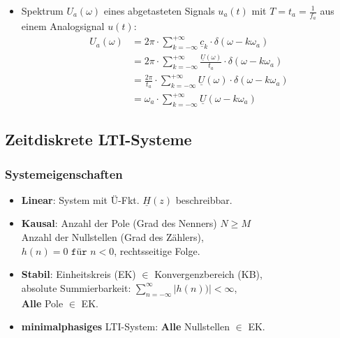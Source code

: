 \begin{itemize}
{	\textit{Abhilfe}: Eingangssignal auf $\omega_g$-Band begrenzen und\\ \textbf{Abtasttheorem} einhalten, Verringerung von $t_a$.}
\normalsize
\begin{gather*}
	\boxed{\omega_a \ge 2 \omega_g} \text{ bzw. } f_a \ge 2 f_g\\
	\boxed{\omega_g \le \frac{\omega_a}{2}} = \frac{1}{2} \cdot \frac{2\pi}{t_a} \text{ bzw. } f_g \ge \frac{f_a}{2}
\end{gather*}
{\footnotesize Merke: zeitbegrenztes Signal: $\infty$ langes Spektrum $\rightarrow$ Aliasing\\
Dirac-Sprung im Signal: $\infty$ hohe $f$ im Spektrum $\rightarrow$ Aliasing}

\item Spektrum $U_a(\omega)$ eines abgetasteten Signals $u_a(t)$ mit $T=t_a = \frac{1}{f_a}$ aus einem Analogsignal $u(t)$:
\begin{align*}
U_a(\omega) &= 2\pi \cdot \sum_{k=-\infty}^{+\infty} \underline{c}_k \cdot \delta(\omega-k\omega_a)\\
& = 2\pi \cdot \sum_{k=-\infty}^{+\infty} \frac{\underline{U}(\omega)}{t_a} \cdot \delta(\omega-k\omega_a)\\
&= \frac{2\pi}{t_a} \cdot \sum_{k=-\infty}^{+\infty} \underline{U}(\omega) \cdot \delta(\omega-k\omega_a) \\
& =  \omega_a \cdot \sum_{k=-\infty}^{+\infty} \underline{U}(\omega-k\omega_a)
\end{align*}

\end{itemize}
\clearpage
\vspace{-1.5em}
\subsection{Zeitdiskrete LTI-Systeme}
\subsubsection{Systemeigenschaften}
\begin{itemize}
	\item \textbf{Linear}: System mit Ü-Fkt. $\underline{H}(z)$ beschreibbar.
	\item \textbf{Kausal}:
	      Anzahl der Pole (Grad des Nenners)  $N\ge M$\\
	      Anzahl der Nullstellen (Grad des Zählers),\\
	      $ h(n) = 0 \texttt{ für } n<0 $, rechtsseitige Folge.
	\item \textbf{Stabil}:
	      Einheitskreis (EK) $\in$ Konvergenzbereich (KB),\\
	   absolute Summierbarkeit: $ \sum_{n=-\infty}^{\infty}|h(n))| < \infty $,\\
	   \textbf{Alle} Pole $\in$ EK.
	\item \textbf{minimalphasiges} LTI-System: \textbf{Alle} Nullstellen $\in$ EK.
\end{itemize}


